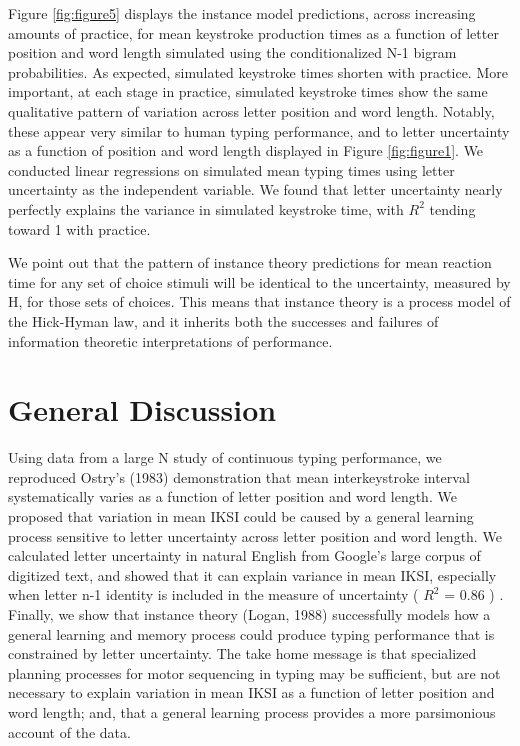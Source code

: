 \documentclass[,man,floatsintext]{apa6}
\begin{document}
Figure \ref{fig:figure5} displays the instance model predictions, across increasing amounts of practice, for mean keystroke production times as a function of letter position and word length simulated using the conditionalized N-1 bigram probabilities. As expected, simulated keystroke times shorten with practice. More important, at each stage in practice, simulated keystroke times show the same qualitative pattern of variation across letter position and word length. Notably, these appear very similar to human typing performance, and to letter uncertainty as a function of position and word length displayed in Figure \ref{fig:figure1}. We conducted linear regressions on simulated mean typing times using letter uncertainty as the independent variable. We found that letter uncertainty nearly perfectly explains the variance in simulated keystroke time, with \(R^2\) tending toward 1 with practice.

We point out that the pattern of instance theory predictions for mean reaction time for any set of choice stimuli will be identical to the uncertainty, measured by H, for those sets of choices. This means that instance theory is a process model of the Hick-Hyman law, and it inherits both the successes and failures of information theoretic interpretations of performance.

\hypertarget{general-discussion}{%
\section{General Discussion}\label{general-discussion}}

Using data from a large N study of continuous typing performance, we reproduced Ostry's (1983) demonstration that mean interkeystroke interval systematically varies as a function of letter position and word length. We proposed that variation in mean IKSI could be caused by a general learning process sensitive to letter uncertainty across letter position and word length. We calculated letter uncertainty in natural English from Google's large corpus of digitized text, and showed that it can explain variance in mean IKSI, especially when letter n-1 identity is included in the measure of uncertainty ( \(R^2\) = 0.86 ) . Finally, we show that instance theory (Logan, 1988) successfully models how a general learning and memory process could produce typing performance that is constrained by letter uncertainty. The take home message is that specialized planning processes for motor sequencing in typing may be sufficient, but are not necessary to explain variation in mean IKSI as a function of letter position and word length; and, that a general learning process provides a more parsimonious account of the data.
\end{document}
